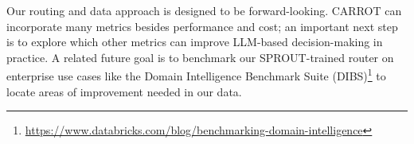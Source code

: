 Our routing and data approach is designed to be forward-looking. CARROT can incorporate many metrics besides performance and cost; an important next step is to explore which other metrics can improve LLM-based decision-making in practice. A related future goal is to benchmark our SPROUT-trained router on enterprise use cases like the Domain Intelligence Benchmark Suite (DIBS)\footnote{\url{https://www.databricks.com/blog/benchmarking-domain-intelligence}} to locate areas of improvement needed in our data.

